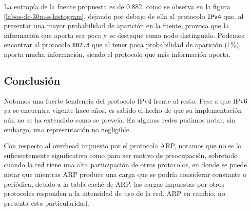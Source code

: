 \documentclass[final,inline,a4paper,narroweqnarray]{ieee}
\begin{document}
  La entropía de la fuente propuesta es de 0.882, como se observa en la
  figura \ref{labos-dc-30m-s-histogram}, dejando por debajo de ella al
  protocolo \texttt{IPv4} que, al presentar una mayor probabilidad de
  aparición en la fuente, provoca que la información que aporta sea
  poca y se destaque como nodo distinguido. Podemos encontrar al protocolo 
  \texttt{802.3} que al tener poca probabilidad de aparición
  (1\%), aporta mucha información, siendo el protocolo que más información
  aporta.

    \subsection{Conclusión}

    Notamos una fuerte tendencia del protocolo IPv4 frente al resto. Pese a que IPv6 ya se encuentra vigente hace años, es sabido el hecho de que su implementación aún no se ha extendido como se preveía. En algunas redes pudimos notar, sin embargo, una representación no negligible.

    Con respecto al overhead impuesto por el protocolo ARP, notamos que no es lo suficientemente significativo como para ser motivo de preocupación, sobretodo cuando la red tiene una alta participación de otros protocolos, en donde se puede notar que mientras ARP produce una carga que se podría considerar constante o periódica, debido a la tabla caché de ARP, las cargas impuestas por otros protocoles responden a la intensidad de uso de la red. ARP en cambio, no presenta esta particularidad.





\end{document}
